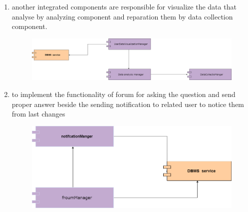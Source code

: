 \begin{enumerate}
\item another integrated components are responsible for visualize the data that analyse by analyzing component and reparation them  by data collection component.\\
\begin{figure}[H]
  \centering
  \includegraphics[width=1\textwidth,keepaspectratio]{figures/test3.png}
\end{figure}
\clearpage
\item to implement the functionality of forum for asking the question and send proper answer beside the sending  notification to related user to notice them from last changes\\
\begin{figure}[H]
  \centering
  \includegraphics[width=1\textwidth,keepaspectratio]{figures/test4 (1).png}
\end{figure}

\end{enumerate}

\clearpage